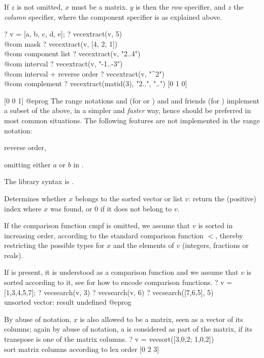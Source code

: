 If $z$ is not omitted, $x$ must be a matrix. $y$ is then the \emph{row}
specifier, and $z$ the \emph{column} specifier, where the component specifier
is as explained above.

\bprog
? v = [a, b, c, d, e];
? vecextract(v, 5)         \\@com mask
? vecextract(v, [4, 2, 1]) \\@com component list
? vecextract(v, "2..4")    \\@com interval
? vecextract(v, "-1..-3")  \\@com interval + reverse order
? vecextract(v, "^2")      \\@com complement
? vecextract(matid(3), "2..", "..")
[0 1 0]

[0 0 1]
@eprog
The range notations  and  (for  or
) and  and friends (for ) implement a
subset of the above, in a simpler and \emph{faster} way, hence should be
preferred in most common situations. The following features are not
implemented in the range notation:

\item reverse order,

\item omitting either $a$ or $b$ in .

The library syntax is .

\label{se:vecsearch}
Determines whether $x$ belongs to the sorted vector or list $v$: return
the (positive) index where $x$ was found, or $0$ if it does not belong to
$v$.

If the comparison function cmpf is omitted, we assume that $v$ is sorted in
increasing order, according to the standard comparison function $<$, thereby
restricting the possible types for $x$ and the elements of $v$ (integers,
fractions or reals).

If  is present, it is understood as a comparison function and we
assume that $v$ is sorted according to it, see  for how to
encode comparison functions.
\bprog
? v = [1,3,4,5,7];
? vecsearch(v, 3)
? vecsearch(v, 6)
? vecsearch([7,6,5], 5) \\ unsorted vector: result undefined
@eprog

By abuse of notation, $x$ is also allowed to be a matrix, seen as a vector
of its columns; again by abuse of notation, a  is considered
as part of the matrix, if its transpose is one of the matrix columns.
\bprog
? v = vecsort([3,0,2; 1,0,2]) \\ sort matrix columns according to lex order
[0 2 3]

